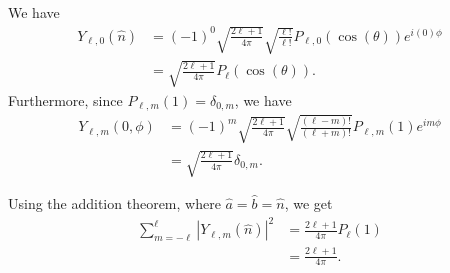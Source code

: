 \documentclass[10pt]{mypackage}
\begin{document}
\begin{solution}[35.12]
  We have
  \begin{align*}
    Y_{\ell,0}\left( \hat{n} \right) &= \left( -1 \right)^{0}\sqrt{\frac{2\ell + 1}{4\pi}}\sqrt{\frac{\ell!}{\ell!}}P_{\ell,0}\left( \cos\left( \theta \right) \right)e^{i\left( 0 \right)\phi}\\
                                     &= \sqrt{\frac{2\ell + 1}{4\pi}}P_{\ell}\left( \cos\left( \theta \right) \right).
  \end{align*}
  Furthermore, since $P_{\ell,m}\left( 1 \right) = \delta_{0,m}$, we have
  \begin{align*}
    Y_{\ell,m}\left( 0,\phi \right) &= \left( -1 \right)^{m}\sqrt{\frac{2\ell + 1}{4\pi}}\sqrt{\frac{\left( \ell-m \right)!}{\left( \ell + m \right)!}}P_{\ell,m}\left( 1 \right)e^{im\phi}\\
                                    &= \sqrt{\frac{2\ell + 1}{4\pi}}\delta_{0,m}.
  \end{align*}
  
\end{solution}
\begin{solution}[35.16]
  Using the addition theorem, where $\hat{a} = \hat{b} = \hat{n}$, we get
  \begin{align*}
    \sum_{m=-\ell}^{\ell}\left\vert Y_{\ell,m}\left( \hat{n} \right) \right\vert^2 &= \frac{2\ell + 1}{4\pi}P_{\ell}\left( 1 \right)\\
                                                                                   &= \frac{2\ell + 1}{4\pi}.
  \end{align*}
\end{solution}
\begin{solution}[35.17 (c)]

\end{solution}
\begin{solution}[35.21]

\end{solution}
\begin{solution}[35.25]

\end{solution}
\end{document}
